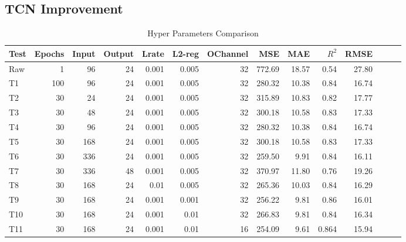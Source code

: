 

\subsection{TCN Improvement}
\begin{table}[H]
\centering
\caption{Hyper Parameters Comparison}
\begin{tabular}{l r r r r r r r r r r  r r r}
\toprule
\textbf{Test} & \textbf{Epochs} & \textbf{Input} & \textbf{Output}& \textbf{Lrate} & \textbf{L2-reg} & \textbf{OChannel} & \textbf{MSE} & \textbf{MAE} & \textbf{$R^2$}& \textbf{RMSE} \\
\midrule
Raw & 1& 96& 24& 0.001& 0.005& 32& 772.69& 18.57& 0.54& 27.80\\
T1 & \color{blue}100& 96& 24& 0.001& 0.005& 32& 280.32& 10.38& 0.84& 16.74 \\
T2 & \color{blue}30& 24& 24& 0.001& 0.005& 32& 315.89& 10.83& 0.82& 17.77 \\
T3 & 30& \color{blue}48& 24& 0.001& 0.005& 32& 300.18& 10.58& 0.83& 17.33 \\
T4 & 30& \color{blue}96& 24& 0.001& 0.005& 32& 280.32& 10.38& 0.84& 16.74 \\
T5 & 30& \color{blue}168& 24& 0.001& 0.005& 32& 300.18& 10.58& 0.83& 17.33 \\
T6 & 30& \color{blue}336& 24& 0.001& 0.005& 32& 259.50& 9.91& 0.84& 16.11 \\ %
T7 & 30& 336& \color{blue}48& 0.001& 0.005& 32& 370.97& 11.80& 0.76& 19.26 \\
T8 & 30& 168& 24& \color{blue}0.01& 0.005& 32& 265.36& 10.03& 0.84& 16.29 \\
T9 & 30& 168& 24& 0.001& \color{blue}0.001& 32& 256.22& 9.81& 0.86& 16.01 \\
T10 & 30& 168& 24& 0.001& \color{blue}0.01& 32& 266.83& 9.81& 0.84& 16.34 \\
T11 & 30& 168& 24& 0.001& 0.01& \color{blue}16& 254.09& 9.61& \color{red}0.864& 15.94 \\
\bottomrule
\end{tabular}
\label{tab:hyper}
\end{table}

